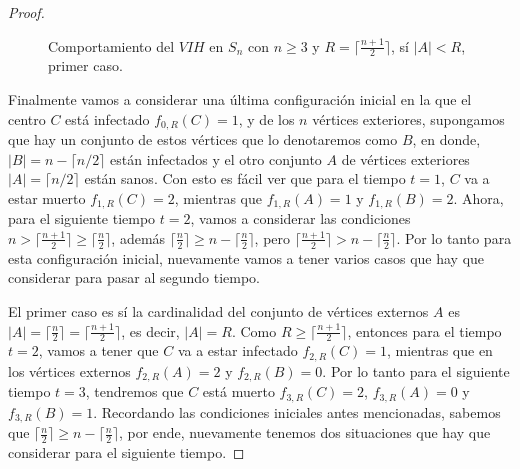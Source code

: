 \documentclass[12pt,titlepage,twoside,openright]{book}
\begin{document}
\begin{proof}
\begin{figure}[h!]
\begin{subfigure}[h]{0.5\linewidth}
    \end{subfigure}
    \caption{Comportamiento del $VIH$ en $S_n$ con $n\geq3$ y $R=\lceil \frac{n+1}{2} \rceil$, s\'i $|A|<R$, primer caso.}
    \label{SnyR=VIH,|A|<R(1)}
    \end{figure}
    Finalmente vamos a considerar una \'ultima configuraci\'on inicial en la que el centro $C$ est\'a infectado $f_{0,R}(C)=1$, y de los $n$ v\'ertices exteriores, supongamos que hay un conjunto de estos v\'ertices que lo denotaremos como $B$, en donde, $|B|=n-\lceil n/2\rceil$ est\'an infectados y el otro conjunto $A$ de v\'ertices exteriores $|A|=\lceil n/2\rceil$ est\'an sanos. Con esto es f\'acil ver que para el tiempo $t=1$, $C$ va a estar muerto $f_{1,R}(C)=2$, mientras que $f_{1,R}(A)=1$ y $f_{1,R}(B)=2$. Ahora, para el siguiente tiempo $t=2$, vamos a considerar las condiciones $n > \lceil \frac{n+1}{2} \rceil \geq \lceil \frac{n}{2} \rceil$, adem\'as $\lceil \frac{n}{2} \rceil \geq n - \lceil \frac{n}{2} \rceil$, pero $\lceil \frac{n+1}{2} \rceil > n - \lceil \frac{n}{2} \rceil$. Por lo tanto para esta configuraci\'on inicial, nuevamente vamos a tener varios casos que hay que considerar para pasar al segundo tiempo.

    El primer caso es s\'i la cardinalidad del conjunto de v\'ertices externos $A$ es $|A|= \lceil \frac{n}{2} \rceil = \lceil \frac{n+1}{2} \rceil$, es decir, $|A|=R$. Como $R \geq \lceil \frac{n+1}{2} \rceil$, entonces para el tiempo $t=2$, vamos a tener que $C$ va a estar infectado $f_{2,R}(C)=1$, mientras que en los v\'ertices externos $f_{2,R}(A)=2$ y $f_{2,R}(B)=0$. Por lo tanto para el siguiente tiempo $t=3$, tendremos que $C$ est\'a muerto $f_{3,R}(C)=2$, $f_{3,R}(A)=0$ y $f_{3,R}(B)=1$. Recordando las condiciones iniciales antes mencionadas, sabemos que $\lceil \frac{n}{2} \rceil \geq n - \lceil \frac{n}{2} \rceil$, por ende, nuevamente tenemos dos situaciones que hay que considerar para el siguiente tiempo. 


\end{proof}
\end{document}
